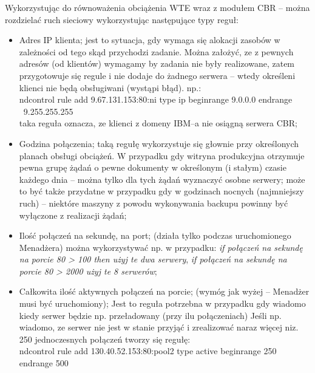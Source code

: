 Wykorzystując do równoważenia obciążenia WTE wraz z modułem CBR -- można rozdzielać ruch sieciowy
wykorzystując następujące typy reguł:
    \begin{itemize}
    \item Adres IP klienta; jest to sytuacja, gdy wymaga się alokacji zasobów w zależności od tego skąd przychodzi
    zadanie. Można założyć, ze z pewnych adresów (od klientów) wymagamy by zadania nie były realizowane, zatem
    przygotowuje się regule i nie dodaje do żadnego serwera -- wtedy określeni klienci nie będą obsługiwani
    (wystąpi błąd). np.:\\

    ndcontrol rule add 9.67.131.153:80:ni type ip beginrange 9.0.0.0 endrange \
    9.255.255.255\\

    taka reguła oznacza, ze klienci z domeny IBM--a nie osiągną serwera CBR;        
    \item Godzina połączenia; taką regułę wykorzystuje się głownie przy określonych planach obsługi obciążeń.
    W przypadku gdy witryna produkcyjna otrzymuje pewna grupę żądań o pewne dokumenty w określonym
    (i stałym) czasie każdego dnia -- można tylko dla tych żądań wyznaczyć osobne serwery; może to być także
    przydatne w przypadku gdy w godzinach nocnych (najmniejszy ruch) -- niektóre maszyny z powodu wykonywania
    backupu powinny być wyłączone z realizacji żądań;
    \item Ilość połączeń na sekundę, na port; (działa tylko podczas uruchomionego Menadżera) można wykorzystywać
    np. w przypadku: \emph{if połączeń na sekundę na porcie 80 > 100 then użyj te dwa serwery}, \emph{if połączeń
    na sekundę na porcie 80 > 2000 użyj te 8 serwerów};
    \item Całkowita ilość aktywnych połączeń na porcie; (wymóg jak wyżej -- Menadżer musi być uruchomiony);
    Jest to reguła potrzebna w przypadku gdy wiadomo kiedy serwer będzie np. przeładowany (przy ilu połączeniach)
    Jeśli np. wiadomo, ze serwer nie jest w stanie przyjąć i zrealizować naraz więcej niz. 250 jednoczesnych połączeń
    tworzy się regułę:\\

    ndcontrol rule add 130.40.52.153:80:pool2 type active beginrange 250 endrange 500\\


\end{itemize}
